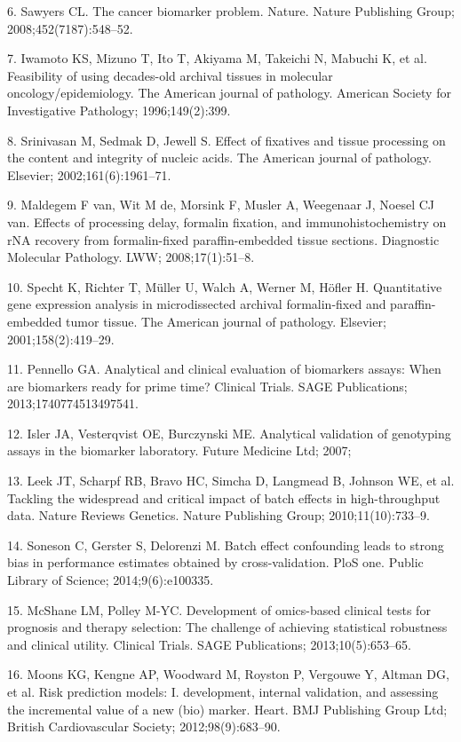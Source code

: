 \documentclass[11pt]{article}
\begin{document}
6. Sawyers CL. The cancer biomarker problem. Nature. Nature Publishing
Group; 2008;452(7187):548--52.

7. Iwamoto KS, Mizuno T, Ito T, Akiyama M, Takeichi N, Mabuchi K, et al.
Feasibility of using decades-old archival tissues in molecular
oncology/epidemiology. The American journal of pathology. American
Society for Investigative Pathology; 1996;149(2):399.

8. Srinivasan M, Sedmak D, Jewell S. Effect of fixatives and tissue
processing on the content and integrity of nucleic acids. The American
journal of pathology. Elsevier; 2002;161(6):1961--71.

9. Maldegem F van, Wit M de, Morsink F, Musler A, Weegenaar J, Noesel CJ
van. Effects of processing delay, formalin fixation, and
immunohistochemistry on rNA recovery from formalin-fixed
paraffin-embedded tissue sections. Diagnostic Molecular Pathology. LWW;
2008;17(1):51--8.

10. Specht K, Richter T, M{ü}ller U, Walch A, Werner M, H{ö}fler H.
Quantitative gene expression analysis in microdissected archival
formalin-fixed and paraffin-embedded tumor tissue. The American journal
of pathology. Elsevier; 2001;158(2):419--29.

11. Pennello GA. Analytical and clinical evaluation of biomarkers
assays: When are biomarkers ready for prime time? Clinical Trials. SAGE
Publications; 2013;1740774513497541.

12. Isler JA, Vesterqvist OE, Burczynski ME. Analytical validation of
genotyping assays in the biomarker laboratory. Future Medicine Ltd;
2007;

13. Leek JT, Scharpf RB, Bravo HC, Simcha D, Langmead B, Johnson WE, et
al. Tackling the widespread and critical impact of batch effects in
high-throughput data. Nature Reviews Genetics. Nature Publishing Group;
2010;11(10):733--9.

14. Soneson C, Gerster S, Delorenzi M. Batch effect confounding leads to
strong bias in performance estimates obtained by cross-validation. PloS
one. Public Library of Science; 2014;9(6):e100335.

15. McShane LM, Polley M-YC. Development of omics-based clinical tests
for prognosis and therapy selection: The challenge of achieving
statistical robustness and clinical utility. Clinical Trials. SAGE
Publications; 2013;10(5):653--65.

16. Moons KG, Kengne AP, Woodward M, Royston P, Vergouwe Y, Altman DG,
et al. Risk prediction models: I. development, internal validation, and
assessing the incremental value of a new (bio) marker. Heart. BMJ
Publishing Group Ltd; British Cardiovascular Society;
2012;98(9):683--90.
\end{document}
